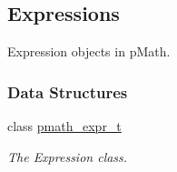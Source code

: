 \hypertarget{group__expressions}{
\subsection{Expressions}
\label{group__expressions}
}
Expression objects in pMath.  


\subsubsection*{Data Structures}
\begin{CompactItemize}
\item 
class \hyperlink{classpmath__expr__t}{pmath\_\-expr\_\-t}
\begin{CompactList}\small\item\em The Expression class. \item\end{CompactList}\end{CompactItemize}
